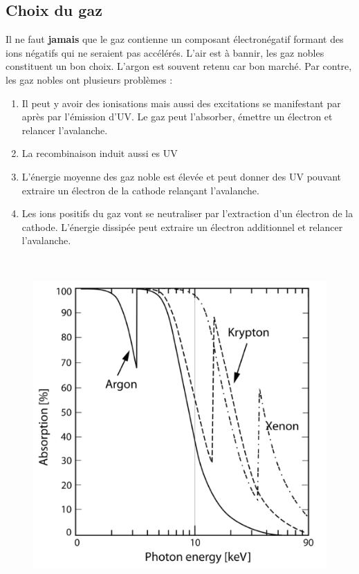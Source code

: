 \subsection{Choix du gaz}%
Il ne faut \textbf{jamais} que le gaz contienne un composant électronégatif formant des ions
négatifs qui ne seraient pas accélérés. L'air est à bannir, les gaz nobles constituent un bon 
choix. L'argon est souvent retenu car bon marché. Par contre, les gaz nobles ont plusieurs 
problèmes :
\begin{enumerate}
\item Il peut y avoir des ionisations mais aussi des excitations se manifestant par après par
l'émission d'UV. Le gaz peut l'absorber, émettre un électron et relancer l'avalanche. 
\item La recombinaison induit aussi es UV
\item L'énergie moyenne des gaz noble est élevée et peut donner des UV pouvant extraire un électron
de la cathode relançant l'avalanche.
\item Les ions positifs du gaz vont se neutraliser par l'extraction d'un électron de la cathode.
L'énergie dissipée peut extraire un électron additionnel et relancer l'avalanche.
\end{enumerate}\ 


	\begin{figure}
	\vspace{-7mm}
	\includegraphics[scale=0.35]{ch8/image10}
	\end{figure}

